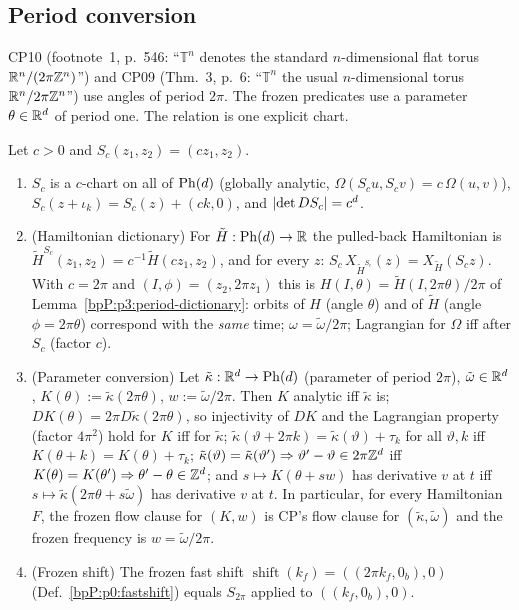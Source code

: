 \subsection{Period conversion}\label{bpP:p1:period}

CP10 (footnote~1, p.~546: ``$\mathbb T^n$ denotes the standard $n$-dimensional flat torus $\mathbb{R}^n/(2\pi\mathbb{Z}^n)$'') and CP09 (Thm.~3, p.~6: ``$\mathbb T^n$ the usual $n$-dimensional torus $\mathbb{R}^n/2\pi\mathbb{Z}^n$'') use angles of period $2\pi$. The frozen predicates use a parameter $\theta\in\mathbb{R}^d$ of period one. The relation is one explicit chart.

\begin{lemma}\label{bpP:p1:period-convert}
Let $c>0$ and $S_c(z_1,z_2)=(cz_1,z_2)$.
\begin{enumerate}[label=(\alph*)]
\item $S_c$ is a $c$-chart on all of $\mathrm{Ph}(d)$ (globally analytic, $\Omega(S_cu,S_cv)=c\,\Omega(u,v)$), $S_c(z+\iota_k)=S_c(z)+(ck,0)$, and $\lvert \det DS_c\rvert=c^d$.
\item \textup{(Hamiltonian dictionary)} For $\tilde H:\mathrm{Ph}(d)\to\mathbb{R}$ the pulled-back Hamiltonian is $\tilde H^{S_c}(z_1,z_2)=c^{-1}\tilde H(cz_1,z_2)$, and for every $z$: $S_c\,X_{\tilde H^{S_c}}(z)=X_{\tilde H}(S_cz)$. With $c=2\pi$ and $(I,\phi)=(z_2,2\pi z_1)$ this is $H(I,\theta)=\tilde H(I,2\pi\theta)/2\pi$ of Lemma~\ref{bpP:p3:period-dictionary}: orbits of $H$ (angle $\theta$) and of $\tilde H$ (angle $\phi=2\pi\theta$) correspond with the \emph{same} time; $\omega=\tilde\omega/2\pi$; Lagrangian for $\Omega$ iff after $S_c$ (factor $c$).
\item \textup{(Parameter conversion)} Let $\tilde\kappa:\mathbb{R}^d\to\mathrm{Ph}(d)$ (parameter of period $2\pi$), $\tilde\omega\in\mathbb{R}^d$, $K(\theta):=\tilde\kappa(2\pi\theta)$, $w:=\tilde\omega/2\pi$. Then $K$ analytic iff $\tilde\kappa$ is; $DK(\theta)=2\pi D\tilde\kappa(2\pi\theta)$, so injectivity of $DK$ and the Lagrangian property (factor $4\pi^2$) hold for $K$ iff for $\tilde\kappa$; $\tilde\kappa(\vartheta+2\pi k)=\tilde\kappa(\vartheta)+\tau_k$ for all $\vartheta,k$ iff $K(\theta+k)=K(\theta)+\tau_k$; $\tilde\kappa(\vartheta)=\tilde\kappa(\vartheta')\Rightarrow\vartheta'-\vartheta\in2\pi\mathbb{Z}^d$ iff $K(\theta)=K(\theta')\Rightarrow\theta'-\theta\in\mathbb{Z}^d$; and $s\mapsto K(\theta+sw)$ has derivative $v$ at $t$ iff $s\mapsto\tilde\kappa(2\pi\theta+s\tilde\omega)$ has derivative $v$ at $t$. In particular, for every Hamiltonian $F$, the frozen flow clause for $(K,w)$ is CP's flow clause for $(\tilde\kappa,\tilde\omega)$ and the frozen frequency is $w=\tilde\omega/2\pi$.
\item \textup{(Frozen shift)} The frozen fast shift $\operatorname{shift}(k_f)=((2\pi k_f,0_b),0)$ (Def.~\ref{bpP:p0:fastshift}) equals $S_{2\pi}$ applied to $((k_f,0_b),0)$.
\end{enumerate}
\end{lemma}
